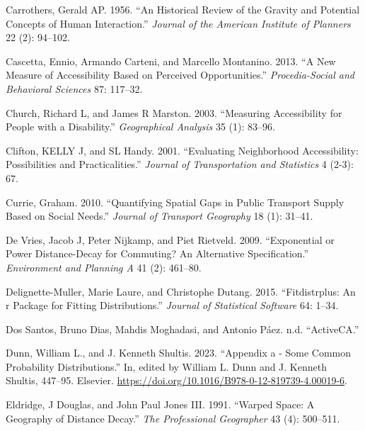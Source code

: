 \documentclass[preprint, 3p,
authoryear]{elsarticle} %
\newlength{\cslhangindent}
\newenvironment{CSLReferences}[2] %
 {\begin{list}{}{%
  \setlength{\itemindent}{0pt}
  \setlength{\leftmargin}{0pt}
  \setlength{\parsep}{0pt}
  \ifodd #1
   \setlength{\leftmargin}{\cslhangindent}
   \setlength{\itemindent}{-1\cslhangindent}
  \fi
  \setlength{\itemsep}{#2\baselineskip}}}
 {\end{list}}
\begin{document}
\begin{CSLReferences}{1}{0}
Carrothers, Gerald AP. 1956. {``An Historical Review of the Gravity and
Potential Concepts of Human Interaction.''} \emph{Journal of the
American Institute of Planners} 22 (2): 94--102.

Cascetta, Ennio, Armando Carteni, and Marcello Montanino. 2013. {``A New
Measure of Accessibility Based on Perceived Opportunities.''}
\emph{Procedia-Social and Behavioral Sciences} 87: 117--32.

Church, Richard L, and James R Marston. 2003. {``Measuring Accessibility
for People with a Disability.''} \emph{Geographical Analysis} 35 (1):
83--96.

Clifton, KELLY J, and SL Handy. 2001. {``Evaluating Neighborhood
Accessibility: Possibilities and Practicalities.''} \emph{Journal of
Transportation and Statistics} 4 (2-3): 67.

Currie, Graham. 2010. {``Quantifying Spatial Gaps in Public Transport
Supply Based on Social Needs.''} \emph{Journal of Transport Geography}
18 (1): 31--41.

De Vries, Jacob J, Peter Nijkamp, and Piet Rietveld. 2009.
{``Exponential or Power Distance-Decay for Commuting? An Alternative
Specification.''} \emph{Environment and Planning A} 41 (2): 461--80.

Delignette-Muller, Marie Laure, and Christophe Dutang. 2015.
{``Fitdistrplus: An r Package for Fitting Distributions.''}
\emph{Journal of Statistical Software} 64: 1--34.

Dos Santos, Bruno Dias, Mahdis Moghadasi, and Antonio Páez. n.d.
{``ActiveCA.''}

Dunn, William L., and J. Kenneth Shultis. 2023. {``Appendix a - Some
Common Probability Distributions.''} In, edited by William L. Dunn and
J. Kenneth Shultis, 447--95. Elsevier.
\url{https://doi.org/10.1016/B978-0-12-819739-4.00019-6}.

Eldridge, J Douglas, and John Paul Jones III. 1991. {``Warped Space: A
Geography of Distance Decay.''} \emph{The Professional Geographer} 43
(4): 500--511.


\end{CSLReferences}
\end{document}
